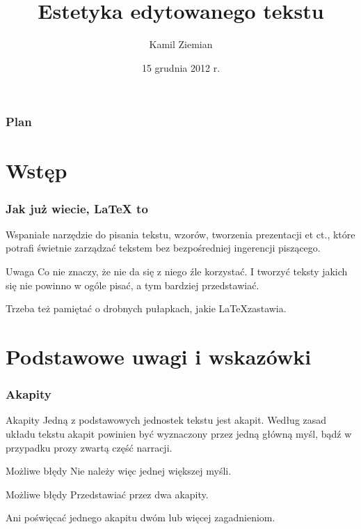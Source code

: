 \documentclass{beamer}
\title[Estetyka edytowanego tekstu]{Estetyka edytowanego tekstu}
\author{Kamil Ziemian}
\date[15.12.2012]{15 grudnia 2012 r.}
\begin{document}
\begin{frame}
\titlepage
\end{frame}

\begin{frame}
\frametitle{Plan}
\tableofcontents
\end{frame}



\section{Wstęp}



\begin{frame}
\frametitle{Jak już wiecie, \LaTeX { to}}
\pause


\begin{block}{}
Wspaniałe narzędzie do pisania tekstu, wzorów, tworzenia prezentacji et ct.,
które potrafi świetnie zarządzać tekstem \linebreak bez bezpośredniej ingerencji piszącego.
\end{block}
\pause

\begin{block}{Uwaga}
\pause
Co nie \newline
znaczy, że nie da się z niego źle \linebreak korzystać.
\pause
I tworzyć teksty jakich się nie powinno w ogóle pisać, a tym bardziej przedstawiać.
\end{block}
\pause

\begin{block}
Trzeba też pamiętać o drobnych pułapkach, jakie \LaTeX zastawia.
\end{block}

\end{frame}



\section{Podstawowe uwagi i wskazówki}

\begin{frame}
  \frametitle{Akapity}


\begin{block}{Akapity}
  Jedną z podstawowych jednostek tekstu jest akapit. Według zasad
  układu tekstu akapit powinien być wyznaczony przez jedną główną
  myśl, bądź w przypadku prozy zwartą część narracji.
\end{block}
\pause

\begin{block}{Możliwe błędy}
  Nie należy więc jednej większej myśli.
\end{block}
\pause

\begin{block}{Możliwe błędy}
  Przedstawiać przez dwa akapity.
\end{block}

\begin{block}{}
  Ani poświęcać jednego akapitu dwóm lub więcej zagadnieniom.
\end{block}

\end{frame}
\end{document}
